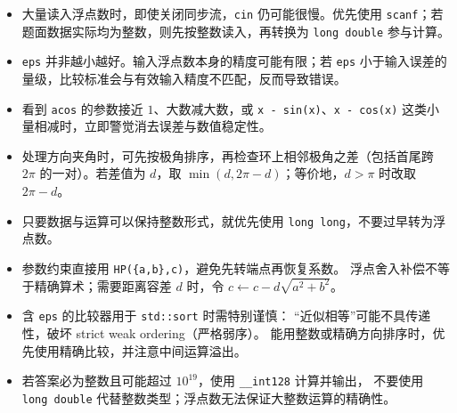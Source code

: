 \begin{itemize}[leftmargin=5mm]
  \setlength{\itemsep}{0pt}
  \item 大量读入浮点数时，即使关闭同步流，\texttt{cin} 仍可能很慢。优先使用
    \texttt{scanf}；若题面数据实际均为整数，则先按整数读入，再转换为
    \texttt{long double} 参与计算。
  \item \texttt{eps} 并非越小越好。输入浮点数本身的精度可能有限；若
    \texttt{eps} 小于输入误差的量级，比较标准会与有效输入精度不匹配，反而导致错误。
  \item 看到 \texttt{acos} 的参数接近 $1$、大数减大数，或
    \texttt{x - sin(x)}、\texttt{x - cos(x)} 这类小量相减时，立即警觉消去误差与数值稳定性。
  \item 处理方向夹角时，可先按极角排序，再检查环上相邻极角之差（包括首尾跨
    $2\pi$ 的一对）。若差值为 $d$，取 $\min(d, 2\pi-d)$；等价地，$d>\pi$
    时改取 $2\pi-d$。
  \item 只要数据与运算可以保持整数形式，就优先使用 \texttt{long long}，不要过早转为浮点数。
  \item 参数约束直接用 \texttt{HP(\{a,b\},c)}，避免先转端点再恢复系数。
    浮点舍入补偿不等于精确算术；需要距离容差 $d$ 时，令 $c\gets c-d\sqrt{a^2+b^2}$。
  \item 含 \texttt{eps} 的比较器用于 \texttt{std::sort} 时需特别谨慎：
    “近似相等”可能不具传递性，破坏 strict weak ordering（严格弱序）。
    能用整数或精确方向排序时，优先使用精确比较，并注意中间运算溢出。
  \item 若答案必为整数且可能超过 $10^{19}$，使用 \texttt{\_\_int128} 计算并输出，
    不要使用 \texttt{long double} 代替整数类型；浮点数无法保证大整数运算的精确性。
\end{itemize}

